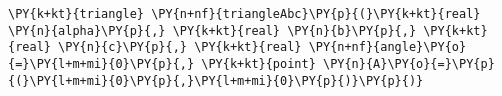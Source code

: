 \begin{Verbatim}[commandchars=\\\{\}]
    \PY{k+kt}{triangle} \PY{n+nf}{triangleAbc}\PY{p}{(}\PY{k+kt}{real} \PY{n}{alpha}\PY{p}{,} \PY{k+kt}{real} \PY{n}{b}\PY{p}{,} \PY{k+kt}{real} \PY{n}{c}\PY{p}{,} \PY{k+kt}{real} \PY{n+nf}{angle}\PY{o}{=}\PY{l+m+mi}{0}\PY{p}{,} \PY{k+kt}{point} \PY{n}{A}\PY{o}{=}\PY{p}{(}\PY{l+m+mi}{0}\PY{p}{,}\PY{l+m+mi}{0}\PY{p}{)}\PY{p}{)}
\end{Verbatim}
